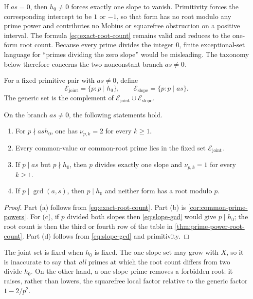 \begin{remark}
\label{rem:zero-slope-branch}
If \(as=0\), then \(h_0\ne0\) forces exactly one slope to vanish.
Primitivity forces the corresponding intercept to be \(1\) or
\(-1\), so that form has no root modulo any prime power and contributes
no Mobius or squarefree obstruction on a positive interval.  The
formula \eqref{eq:exact-root-count} remains valid and reduces to the
one-form root count.  Because every prime divides the integer \(0\),
finite exceptional-set language for ``primes dividing the zero
slope'' would be misleading.  The taxonomy below therefore concerns
the two-nonconstant branch \(as\ne0\).
\end{remark}

\begin{definition}
\label{def:exceptional-primes}
For a fixed primitive pair with \(as\ne0\), define
\[
 \mathcal E_{\mathrm{joint}}=\{p:p\mid h_0\},
 \qquad
 \mathcal E_{\mathrm{slope}}=\{p:p\mid as\}.
\]
The generic set is the complement of
\(\mathcal E_{\mathrm{joint}}\cup\mathcal E_{\mathrm{slope}}\).
\end{definition}

\begin{proposition}
\label{prop:exceptional-prime-audit}
On the branch \(as\ne0\), the following statements hold.
\begin{enumerate}[label=(\alph*),leftmargin=2.2em]
\item For \(p\nmid ash_0\), one has \(\nu_{p,k}=2\) for every
\(k\ge1\).
\item Every common-value or common-root prime lies in the fixed set
\(\mathcal E_{\mathrm{joint}}\).
\item If \(p\mid as\) but \(p\nmid h_0\), then \(p\) divides exactly
one slope and \(\nu_{p,k}=1\) for every \(k\ge1\).
\item If \(p\mid\gcd(a,s)\), then \(p\mid h_0\) and neither form has a
root modulo \(p\).
\end{enumerate}
\end{proposition}

\begin{proof}
Part (a) follows from \eqref{eq:exact-root-count}.  Part (b) is
\cref{cor:common-prime-powers}.  For (c), if \(p\) divided both
slopes then \eqref{eq:slope-gcd} would give \(p\mid h_0\);
the root count is then the third or fourth row of the table in
\cref{thm:prime-power-root-count}.  Part (d) follows from
\eqref{eq:slope-gcd} and primitivity.
\end{proof}

\begin{remark}
\label{rem:exceptional-taxonomy-warning}
The joint set is fixed when \(h_0\) is fixed.  The one-slope set may
grow with \(X\), so it is inaccurate to say that \emph{all} primes at
which the root count differs from two divide \(h_0\).  On the other
hand, a one-slope prime removes a forbidden root: it raises, rather
than lowers, the squarefree local factor relative to the generic
factor \(1-2/p^2\).
\end{remark}
